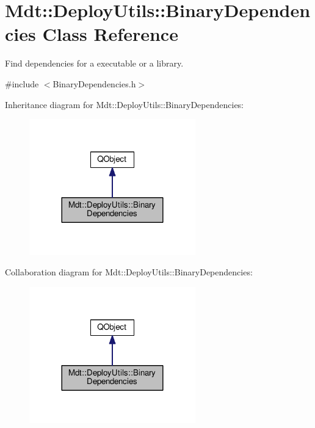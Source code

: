 \hypertarget{class_mdt_1_1_deploy_utils_1_1_binary_dependencies}{}\section{Mdt\+:\+:Deploy\+Utils\+:\+:Binary\+Dependencies Class Reference}
\label{class_mdt_1_1_deploy_utils_1_1_binary_dependencies}


Find dependencies for a executable or a library.  




{\ttfamily \#include $<$Binary\+Dependencies.\+h$>$}



Inheritance diagram for Mdt\+:\+:Deploy\+Utils\+:\+:Binary\+Dependencies\+:
\nopagebreak
\begin{figure}[H]
\begin{center}
\leavevmode
\includegraphics[width=204pt]{class_mdt_1_1_deploy_utils_1_1_binary_dependencies__inherit__graph}
\end{center}
\end{figure}


Collaboration diagram for Mdt\+:\+:Deploy\+Utils\+:\+:Binary\+Dependencies\+:
\nopagebreak
\begin{figure}[H]
\begin{center}
\leavevmode
\includegraphics[width=204pt]{class_mdt_1_1_deploy_utils_1_1_binary_dependencies__coll__graph}
\end{center}
\end{figure}
